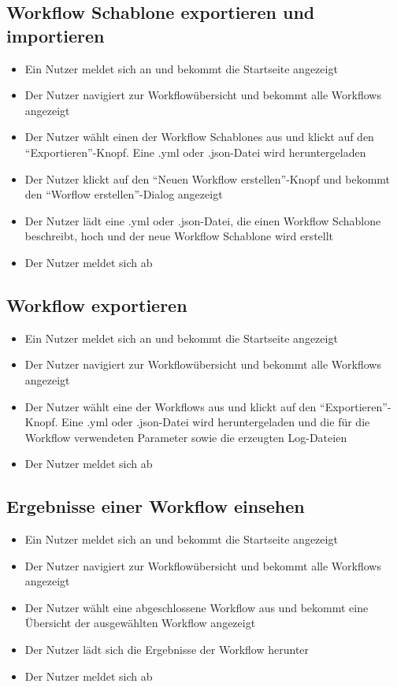 \subsection*{\gls{Workflow Schablone} exportieren und importieren}
\begin{itemize}
    \item Ein \gls{Nutzer} meldet sich an und bekommt die Startseite angezeigt
    \item Der \gls{Nutzer} navigiert zur Workflowübersicht und bekommt alle Workflows angezeigt
    \item Der \gls{Nutzer} wählt einen der \glspl{Workflow Schablone} aus und klickt auf den \enquote{Exportieren}-Knopf. Eine .yml oder .json-Datei wird heruntergeladen
    \item Der \gls{Nutzer} klickt auf den \enquote{Neuen Workflow erstellen}-Knopf und bekommt den \enquote{Worflow erstellen}-Dialog angezeigt
    \item Der \gls{Nutzer} lädt eine .yml oder .json-Datei, die einen \gls{Workflow Schablone} beschreibt, hoch und der neue \gls{Workflow Schablone} wird erstellt
    \item Der \gls{Nutzer} meldet sich ab
\end{itemize}
\newpage
\subsection*{\gls{Workflow} exportieren}
\begin{itemize}
    \item Ein \gls{Nutzer} meldet sich an und bekommt die Startseite angezeigt
    \item Der \gls{Nutzer} navigiert zur Workflowübersicht und bekommt alle Workflows angezeigt
    \item Der \gls{Nutzer} wählt eine der \glspl{Workflow} aus und klickt auf den \enquote{Exportieren}-Knopf. Eine .yml oder .json-Datei wird heruntergeladen und die für die \gls{Workflow} verwendeten Parameter sowie die erzeugten Log-Dateien
    \item Der \gls{Nutzer} meldet sich ab
\end{itemize}

\subsection*{Ergebnisse einer \gls{Workflow} einsehen}
\begin{itemize}
    \item Ein \gls{Nutzer} meldet sich an und bekommt die Startseite angezeigt
    \item Der \gls{Nutzer} navigiert zur Workflowübersicht und bekommt alle Workflows angezeigt
    \item Der \gls{Nutzer} wählt eine abgeschlossene \gls{Workflow} aus und bekommt eine Übersicht der ausgewählten \gls{Workflow} angezeigt
    \item Der \gls{Nutzer} lädt sich die Ergebnisse der \gls{Workflow} herunter
    \item Der \gls{Nutzer} meldet sich ab
\end{itemize}


